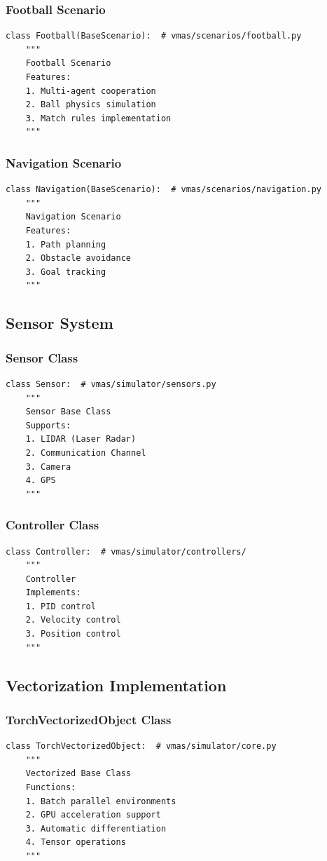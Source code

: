 \documentclass[12pt]{article}
\begin{document}
\subsubsection{Football Scenario}
\begin{verbatim}
class Football(BaseScenario):  # vmas/scenarios/football.py
    """
    Football Scenario
    Features:
    1. Multi-agent cooperation
    2. Ball physics simulation
    3. Match rules implementation
    """
\end{verbatim}

\subsubsection{Navigation Scenario}
\begin{verbatim}
class Navigation(BaseScenario):  # vmas/scenarios/navigation.py  
    """
    Navigation Scenario
    Features:
    1. Path planning
    2. Obstacle avoidance
    3. Goal tracking
    """
\end{verbatim}

\subsection{Sensor System}

\subsubsection{Sensor Class}
\begin{verbatim}
class Sensor:  # vmas/simulator/sensors.py
    """
    Sensor Base Class
    Supports:
    1. LIDAR (Laser Radar)
    2. Communication Channel
    3. Camera
    4. GPS
    """
\end{verbatim}

\subsubsection{Controller Class}
\begin{verbatim}
class Controller:  # vmas/simulator/controllers/
    """
    Controller
    Implements:
    1. PID control
    2. Velocity control
    3. Position control
    """
\end{verbatim}

\subsection{Vectorization Implementation}

\subsubsection{TorchVectorizedObject Class}
\begin{verbatim}
class TorchVectorizedObject:  # vmas/simulator/core.py
    """
    Vectorized Base Class
    Functions:
    1. Batch parallel environments
    2. GPU acceleration support
    3. Automatic differentiation
    4. Tensor operations
    """
\end{verbatim}
\end{document}
